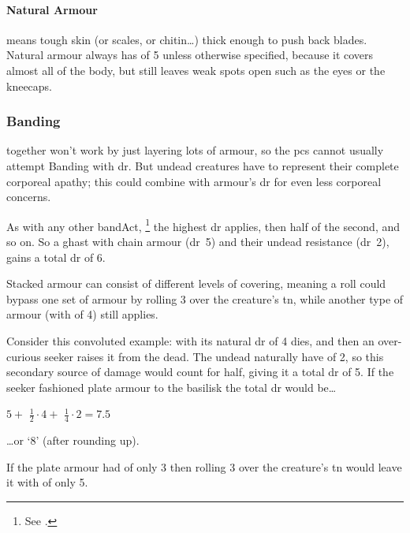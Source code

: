 \begin{multicols}{2}
\paragraph{Natural Armour}
means tough skin (or scales, or chitin\ldots) thick enough to push back blades.
Natural armour always has  of 5 unless otherwise specified, because it covers almost all of the body, but still leaves weak spots open such as the eyes or the kneecaps.

\subsubsection{Banding }
\label{bandingArmour}
together won't work by just layering lots of armour, so the \glspl{pc} cannot usually attempt Banding with \gls{dr}.
But undead creatures have  to represent their complete corporeal apathy; this could combine with armour's \gls{dr} for even less corporeal concerns.

As with any other \gls{bandAct},%
\footnote{See .}
the highest \gls{dr} applies, then half of the second, and so on.
So a ghast with chain armour (\gls{dr}~5) and their undead resistance (\gls{dr}~2), gains a total \gls{dr} of 6.

Stacked armour can consist of different levels of \gls{covering}, meaning a roll could bypass one set of armour by rolling 3 over the creature's \gls{tn}, while another type of armour (with  of 4) still applies.

Consider this convoluted example:  with its natural \gls{dr} of 4 dies, and then an over-curious \gls{seeker} raises it from the dead.
The undead naturally have  of 2, so this secondary source of damage would count for half, giving it a total \gls{dr} of 5.
If the \gls{seeker} fashioned plate armour to the \gls{basilisk} the total \gls{dr} would be\ldots

\null
\begin{center}
{
  \LARGE $5 + $ \Large$\frac{1}{2}\cdot4 + $ \normalsize$\frac{1}{4}\cdot2 =  7.5$
}
\end{center}

\ldots or `8' (after rounding up).

If the plate armour had  of only 3 then rolling 3 over the creature's \gls{tn} would leave it with  of only 5.

\end{multicols}

